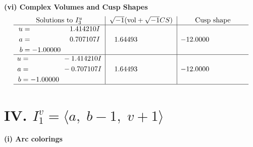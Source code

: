 \documentclass[1p]{elsarticle_modified}
\theoremstyle{definition}
\newcommand{\I}{\sqrt{-1}}
\begin{document}
\newpage\flushleft \textbf{(vi) Complex Volumes and Cusp Shapes}
$$\begin{array}{c|c|c}  
\text{Solutions to }I^u_{3}& \I (\text{vol} + \sqrt{-1}CS) & \text{Cusp shape}\\
 \hline 
\begin{aligned}
u &= \phantom{-0.000000 -}1.414210 I \\
a &= \phantom{-0.000000 -}0.707107 I \\
b &= -1.00000\phantom{ +0.000000I}\end{aligned}
 & \phantom{-}1.64493\phantom{ +0.000000I} & -12.0000\phantom{ +0.000000I} \\ \hline\begin{aligned}
u &= \phantom{-0.000000 } -1.414210 I \\
a &= \phantom{-0.000000 } -0.707107 I \\
b &= -1.00000\phantom{ +0.000000I}\end{aligned}
 & \phantom{-}1.64493\phantom{ +0.000000I} & -12.0000\phantom{ +0.000000I}\\
 \hline 
 \end{array}$$\newpage\newpage\renewcommand{\arraystretch}{1}
\centering \section*{IV. $I^v_{1}= \langle a,\;b-1,\;v+1 \rangle$}
\flushleft \textbf{(i) Arc colorings}\\
\end{document}
